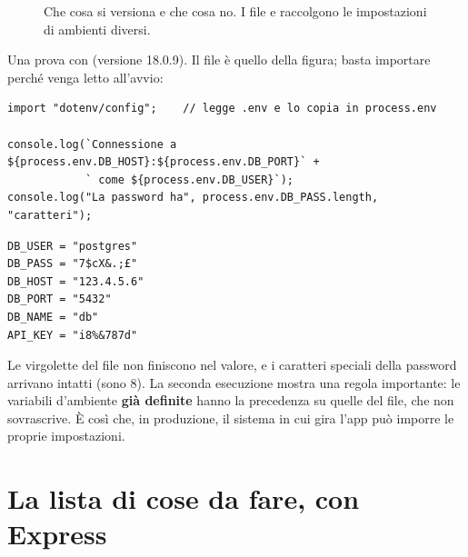 \begin{figure}[H]
  \caption{Che cosa si versiona e che cosa no. I file  e
            raccolgono le impostazioni di ambienti diversi.}
  \label{fig:dotenv}
\end{figure}

Una prova con  (versione 18.0.9). Il file  è quello
della figura; basta importare  perché venga letto
all'avvio:

\begin{lstlisting}[style=js, name=config.js]
import "dotenv/config";    // legge .env e lo copia in process.env

console.log(`Connessione a ${process.env.DB_HOST}:${process.env.DB_PORT}` +
            ` come ${process.env.DB_USER}`);
console.log("La password ha", process.env.DB_PASS.length, "caratteri");
\end{lstlisting}

\begin{affianco}[0.3][t]
\begin{lstlisting}[style=plain, name=.env]
DB_USER = "postgres"
DB_PASS = "7$cX&.;£"
DB_HOST = "123.4.5.6"
DB_PORT = "5432"
DB_NAME = "db"
API_KEY = "i8%&787d"
\end{lstlisting}
\risultato
{}
\end{affianco}

Le virgolette del file  non finiscono nel valore, e i caratteri
speciali della password arrivano intatti (sono 8). La seconda esecuzione mostra
una regola importante: le variabili d'ambiente \textbf{già definite} hanno la
precedenza su quelle del file, che  non sovrascrive. È così che, in
produzione, il sistema in cui gira l'app può imporre le proprie impostazioni.

\section{La lista di cose da fare, con Express}

